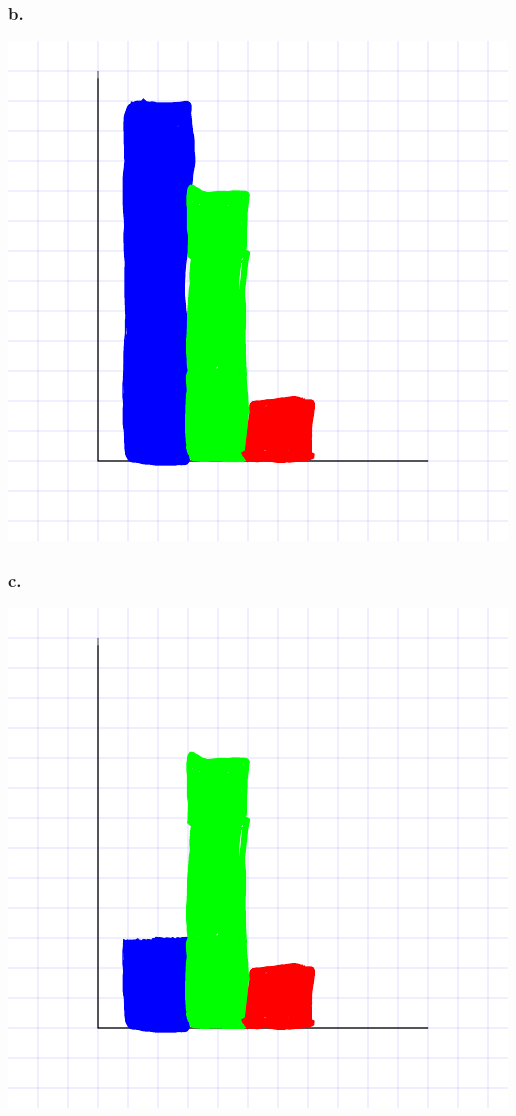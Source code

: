 \documentclass[11pt]{article}
\begin{document}
\subsubsection*{b.}
\includegraphics{homework2_section13_problem6b_histogram}

\subsubsection*{c.}
\includegraphics{homework2_section13_problem6c_histogram}
\end{document}
